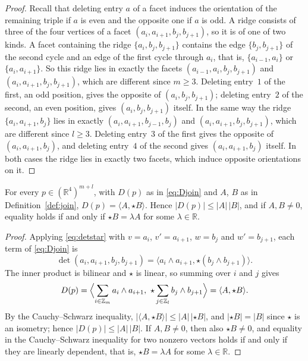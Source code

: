 \begin{proof}
  Recall that deleting entry $a$ of a facet induces the orientation of the
  remaining triple if $a$ is even and the opposite one if $a$ is odd. A ridge
  consists of three of the four vertices of a facet
  $(a_{i}, a_{i+1}, b_{j}, b_{j+1})$, so it is of one of two kinds.
  A facet containing the ridge $\{a_{i}, b_{j}, b_{j+1}\}$ contains the edge
  $\{b_{j}, b_{j+1}\}$ of the second cycle and an edge of the first cycle
  through $a_{i}$, that is, $\{a_{i-1}, a_{i}\}$ or $\{a_{i}, a_{i+1}\}$. So
  this ridge lies in exactly the facets $(a_{i-1}, a_{i}, b_{j}, b_{j+1})$ and
  $(a_{i}, a_{i+1}, b_{j}, b_{j+1})$, which are different since $m \geq 3$.
  Deleting entry~$1$ of the first, an odd position, gives the opposite of
  $(a_{i}, b_{j}, b_{j+1})$; deleting entry~$2$ of the second, an even
  position, gives $(a_{i}, b_{j}, b_{j+1})$ itself.
  In the same way the ridge $\{a_{i}, a_{i+1}, b_{j}\}$ lies in exactly
  $(a_{i}, a_{i+1}, b_{j-1}, b_{j})$ and $(a_{i}, a_{i+1}, b_{j}, b_{j+1})$,
  which are different since $l \geq 3$. Deleting entry~$3$ of the first gives
  the opposite of $(a_{i}, a_{i+1}, b_{j})$, and deleting entry~$4$ of the
  second gives $(a_{i}, a_{i+1}, b_{j})$ itself.
  In both cases the ridge lies in exactly two facets, which induce opposite
  orientations on it.
\end{proof}

\begin{lemma}
  \label{lem:factor}
  For every $p \in (\mathbb{R}^{4})^{m+l}$, with $D(p)$ as in \eqref{eq:Djoin}
  and $A$, $B$ as in Definition~\ref{def:join},
  $D(p) = \langle A, \star B\rangle$. Hence $|D(p)| \leq |A|\,|B|$, and if
  $A, B \neq 0$, equality holds if and only if $\star B = \lambda A$ for some
  $\lambda \in \mathbb{R}$.
\end{lemma}

\begin{proof}
  Applying \eqref{eq:detstar} with $v = a_{i}$, $v' = a_{i+1}$, $w = b_{j}$
  and $w' = b_{j+1}$, each term of \eqref{eq:Djoin} is
  \[
    \det(a_{i}, a_{i+1}, b_{j}, b_{j+1})
    = \langle a_{i} \wedge a_{i+1}, \star(b_{j} \wedge b_{j+1})\rangle.
  \]
  The inner product is bilinear and $\star$ is linear, so summing over $i$
  and $j$ gives
  \[
    D(p) = \Bigl\langle \sum_{i \in \mathbb{Z}_{m}} a_{i} \wedge a_{i+1},\
      \star \sum_{j \in \mathbb{Z}_{l}} b_{j} \wedge b_{j+1} \Bigr\rangle
    = \langle A, \star B\rangle.
  \]
  By the Cauchy--Schwarz inequality, $|\langle A, \star B\rangle| \leq
  |A|\,|\star B|$, and $|\star B| = |B|$ since $\star$ is an isometry; hence
  $|D(p)| \leq |A|\,|B|$. If $A, B \neq 0$, then also $\star B \neq 0$, and
  equality in the Cauchy--Schwarz inequality for two nonzero vectors holds
  if and only if they are linearly dependent, that is, $\star B = \lambda A$
  for some $\lambda \in \mathbb{R}$.
\end{proof}
